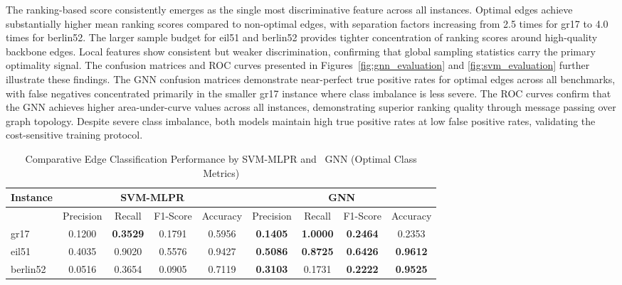 \documentclass[10pt,twoside]{article}
\numberwithin{equation}{section}
\begin{document}
	The ranking-based score consistently emerges as the single most discriminative feature across all instances. Optimal edges achieve substantially higher mean ranking scores compared to non-optimal edges, with separation factors increasing from 2.5 times for gr17 to 4.0 times for berlin52. The larger sample budget for eil51 and berlin52 provides tighter concentration of ranking scores around high-quality backbone edges. Local features show consistent but weaker discrimination, confirming that global sampling statistics carry the primary optimality signal. The confusion matrices and ROC curves presented in Figures~\ref{fig:gnn_evaluation} and \ref{fig:svm_evaluation} further illustrate these findings. The GNN confusion matrices demonstrate near-perfect true positive rates for optimal edges across all benchmarks, with false negatives concentrated primarily in the smaller gr17 instance where class imbalance is less severe. The ROC curves confirm that the GNN achieves higher area-under-curve values across all instances, demonstrating superior ranking quality through message passing over graph topology. Despite severe class imbalance, both models maintain high true positive rates at low false positive rates, validating the cost-sensitive training protocol.


	


	\begin{table}[htbp]


		\centering


		\caption{Comparative Edge Classification Performance by SVM-MLPR and \ GNN (Optimal Class Metrics)}


		\label{tab:optimal_metrics}


		\small


		\begin{tabular}{@{}l|cccc|cccc@{}}\hline


			\textbf{Instance} & \multicolumn{4}{c}{\textbf{SVM-MLPR}} & \multicolumn{4}{c}{\textbf{GNN}} \\ \hline


			& Precision & Recall & F1-Score & Accuracy & Precision & Recall & F1-Score & Accuracy \\


			gr17 & 0.1200 & \textbf{0.3529} & 0.1791 & 0.5956 & \textbf{0.1405} & \textbf{1.0000} & \textbf{0.2464} & 0.2353 \\


			eil51 & 0.4035 & 0.9020 & 0.5576 & 0.9427 & \textbf{0.5086} & \textbf{0.8725} & \textbf{0.6426} & \textbf{0.9612} \\


			berlin52 & 0.0516 & 0.3654 & 0.0905 & 0.7119 & \textbf{0.3103} & 0.1731 & \textbf{0.2222} & \textbf{0.9525} \\ \hline


		\end{tabular}


	\end{table}
\end{document}
